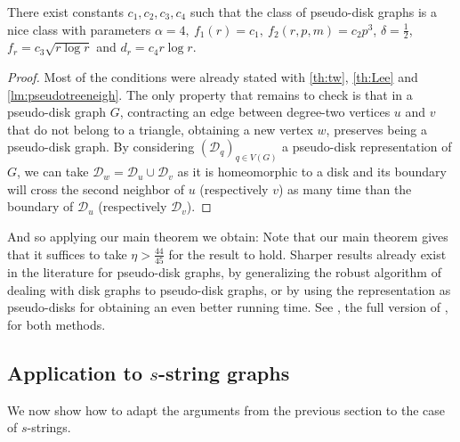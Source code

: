 \documentclass{amsart}
\newcommand{\D}{\mathcal{D}} \newcommand{\R}{\mathcal{R}} \newcommand{\C}{\mathcal{C}} \newcommand{\E}{\mathcal{E}}
\begin{document}
\begin{lemma}
    There exist constants $c_1,c_2,c_3,c_4$ such that the class of pseudo-disk graphs is a nice class with parameters $\alpha=4,~f_1(r)=c_1,~f_2(r,p,m)=c_2p^3$, $\delta=\frac 12$, $f_r=c_3\sqrt{r\log r}$ and $d_r=c_4r\log r$.
\end{lemma}
\begin{proof}
Most of the conditions were already stated with \autoref{th:tw}, \autoref{th:Lee} and \autoref{lm:pseudotreeneigh}. The only property that remains to check is that in a pseudo-disk graph $G$, contracting an edge between degree-two vertices $u$ and $v$ that do not belong to a triangle, obtaining a new vertex $w$, preserves being a pseudo-disk graph. 
By considering $(\D_q)_{q\in V(G)}$ a pseudo-disk representation of $G$, we can take $\D_w=\D_u\cup \D_v$ as it is homeomorphic to a disk and its boundary will cross the second neighbor of $u$ (respectively $v$) as many time than the boundary of $\D_u$ (respectively $\D_v$).
\end{proof}
And so applying our main theorem we obtain:
\maincortwo*
Note that our main theorem gives that it suffices to take $\eta>\frac{44}{45}$ for the result to hold. Sharper results already exist in the literature for pseudo-disk graphs, by generalizing the robust algorithm of \cite{lokSODA22} dealing with disk graphs to pseudo-disk graphs, or by using the representation as pseudo-disks for obtaining an even better running time. See \cite{preprintFVSpseudo}, the full version of \cite{FVS-WG}, for both methods.
\subsection{Application to \texorpdfstring{$s$}{s}-string graphs}\label{ssec:sstring}
We now show how to adapt the arguments from the previous section to the case of $s$-strings.
\end{document}
